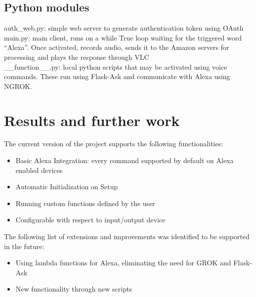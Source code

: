 \documentclass[a4paper,11pt]{article}
\begin{document}
\subsection{Python modules} 
auth\_web.py: simple web server to generate authentication token using OAuth\\
main.py: main client, runs on a while True loop waiting for the triggered word “Alexa”. Once activated, records audio, sends it to the Amazon servers for processing and plays the response through VLC\\
\_\_function\_\_.py: local python scripts that may be activated using voice commands. These run using Flask-Ask and communicate with Alexa using NGROK. \\



\section{Results and further work}


The current version of the project supports the following functionalities:
\begin{itemize}  
\item Basic Alexa Integration: every command supported by default on Alexa enabled devices
\item Automatic Initialization on Setup
\item Running custom functions defined by the user
\item Configurable with respect to input/output device\\
\end{itemize}

The following list of extensions and improvements was identified to be supported in the future:
\begin{itemize}  
\item Using lambda functions for Alexa, eliminating the need for GROK and Flask-Ask
\item New functionality through new scripts
\end{itemize}
\end{document}

